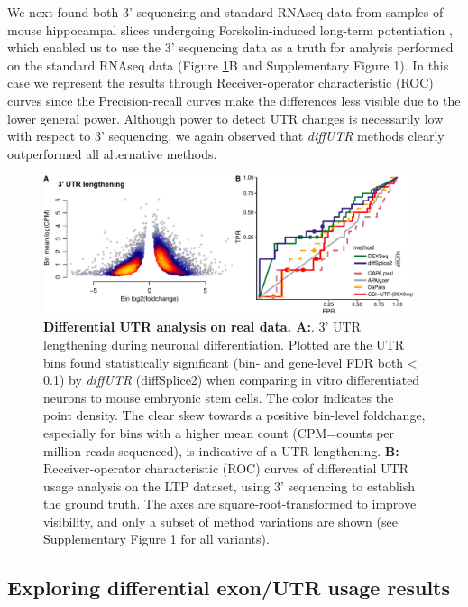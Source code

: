 \documentclass{bmcart}
\begin{document}
We next found both 3' sequencing and standard RNAseq data from samples of mouse hippocampal slices undergoing Forskolin-induced long-term potentiation \cite{Fontes2017Activity-DependentPotentiation}, which enabled us to use the 3' sequencing data as a truth for analysis performed on the standard RNAseq data (Figure \ref{fig:realdata}B and Supplementary Figure 1). In this case we represent the results through Receiver-operator characteristic (ROC) curves since the Precision-recall curves make the differences less visible due to the lower general power. Although power to detect UTR changes is necessarily low with respect to 3' sequencing, we again observed that \textit{diffUTR} methods clearly outperformed all alternative methods.

\begin{figure}
\includegraphics[width=0.97\textwidth]{figure3.pdf}
\caption{\textbf{Differential UTR analysis on real data. A:}. 3' UTR lengthening during neuronal differentiation. Plotted are the UTR bins found statistically significant (bin- and gene-level FDR both < 0.1) by \textit{diffUTR} (diffSplice2) when comparing in vitro differentiated neurons to mouse embryonic stem cells. The color indicates the point density. The clear skew towards a positive bin-level foldchange, especially for bins with a higher mean count (CPM=counts per million reads sequenced), is indicative of a UTR lengthening. \textbf{B:} Receiver-operator characteristic (ROC) curves of differential UTR usage analysis on the LTP dataset, using 3' sequencing to establish the ground truth. The axes are square-root-transformed to improve visibility, and only a subset of method variations are shown (see Supplementary Figure 1 for all variants).}
\label{fig:realdata}
\end{figure}


\subsection*{Exploring differential exon/UTR usage results}
\end{document}
